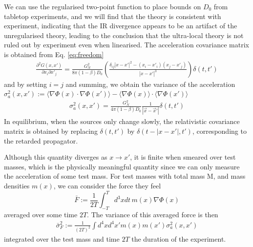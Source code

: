 \documentclass[aps,pra,amsmath,amssymb,amsthm,floatfix,nofootinbib,notitlepage,superscriptaddress,10pt]{revtex4-2}
\begin{document}
We can use the regularised two-point function to place bounds on $D_0$ from tabletop experiments, and we will find that the theory is consistent with experiment, indicating that the IR divergence appears to be an artifact of the unregularised theory, leading to the conclusion that the ultra-local theory is not ruled out by experiment even when linearised.
The acceleration covariance matrix is obtained from Eq. \eqref{eq:freedom}
\begin{align}
	\frac{\partial^2 G(x,x')}{ \partial{x_i}\partial{x'_j}}=\frac{G_N^2}{8\pi (1-\beta) D_{0}} \left( \frac{\delta_{ij} |x - x'|^2 - (x_i - x'_i)(x_j - x'_j)}{|x - x'|^3} \right)\delta(t,t')
\end{align}
and by setting $i=j$ and summing, we obtain the variance of the acceleration $\sigma_a^2(x,x'):=\langle\nabla\Phi(x)\cdot\nabla\Phi(x')\rangle-\langle\nabla\Phi(x)\rangle\cdot\langle\nabla\Phi(x')\rangle$
\begin{align}
	\sigma_a^2(x,x')=\frac{G_N^2}{4\pi (1-\beta)D_{0}}\frac{1}{|\vec{x}-\vec{x}'|}\delta(t,t')
	\label{eq:AccVartt}
\end{align}
In equilibrium, when the sources only change slowly, the relativistic covariance matrix is obtained by replacing $\delta(t,t')$ by $\delta(t- |x-x'|,t')$, corresponding to the retarded propagator. 

Although this quantity diverges as $x\rightarrow x'$, it is finite when smeared over test masses, which is the physically meaningful quantity since we can only measure the acceleration of some test mass. 
For test masses with total mass M, and mass densities $m(x)$, we can consider
the force they feel 
\begin{equation}
	\bar{F}:=\frac{1}{2T}\int_{-T}^T d^3x dt\, m(x)\nabla\Phi(x)
\end{equation}
averaged over some time $2T$. The variance 
of this averaged force is then
\begin{align}
	\bar{\sigma}_F^2:=\frac{1}{(2T)^2}\int d^4x d^4x' m(x)m(x')\sigma^2_a(x,x')
	\label{eq:acceleration_variance}
\end{align}
integrated over the test mass and time $2T$ the duration of the experiment. 
\end{document}

